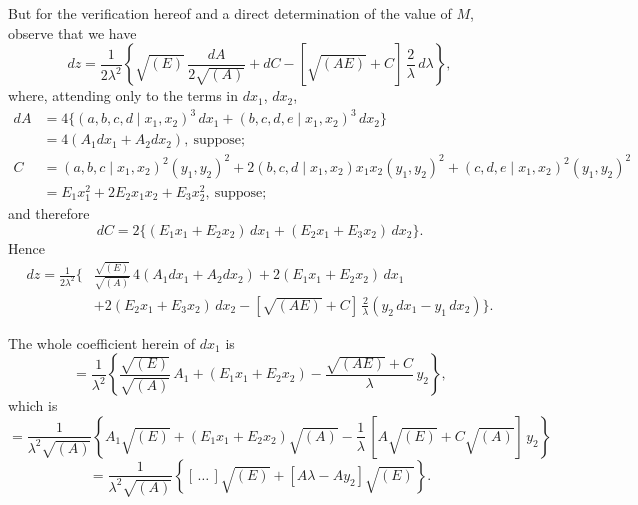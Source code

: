 \documentclass[11pt,a4paper]{article}
\begin{document}
But for the verification hereof and a direct determination of the value of $M$, observe that we have
\[
dz = \frac{1}{2\lambda^2}\!\left\{\sqrt{(E)}\,\frac{dA}{2\sqrt{(A)}} + dC - [\sqrt{(AE)} + C]\,\frac{2}{\lambda}\,d\lambda\right\},
\]
where, attending only to the terms in $dx_1$, $dx_2$,
\begin{align*}
dA &= 4\{(a, b, c, d \mid x_1, x_2)^3\,dx_1 + (b, c, d, e \mid x_1, x_2)^3\,dx_2\}\\
&= 4(A_1 dx_1 + A_2 dx_2),\ \text{suppose};\\
C &= (a, b, c \mid x_1, x_2)^2(y_1, y_2)^2 + 2(b, c, d \mid x_1, x_2)x_1 x_2(y_1, y_2)^2 + (c, d, e \mid x_1, x_2)^2(y_1, y_2)^2\\
&= E_1 x_1^2 + 2E_2 x_1 x_2 + E_3 x_2^2,\ \text{suppose};
\end{align*}
and therefore
\[
dC = 2\{(E_1 x_1 + E_2 x_2)\,dx_1 + (E_2 x_1 + E_3 x_2)\,dx_2\}.
\]
Hence
\begin{align*}
dz = \frac{1}{2\lambda^2}\!\bigg\{&\frac{\sqrt{(E)}}{\sqrt{(A)}}\,4(A_1 dx_1 + A_2 dx_2) + 2(E_1 x_1 + E_2 x_2)\,dx_1\\
&+ 2(E_2 x_1 + E_3 x_2)\,dx_2 - [\sqrt{(AE)} + C]\,\frac{2}{\lambda}(y_2\,dx_1 - y_1\,dx_2)\bigg\}.
\end{align*}

The whole coefficient herein of $dx_1$ is
\[
= \frac{1}{\lambda^2}\!\left\{\frac{\sqrt{(E)}}{\sqrt{(A)}}\,A_1 + (E_1 x_1 + E_2 x_2) - \frac{\sqrt{(AE)} + C}{\lambda}\,y_2\right\},
\]
which is
\[
= \frac{1}{\lambda^2 \sqrt{(A)}}\!\left\{A_1 \sqrt{(E)} + (E_1 x_1 + E_2 x_2)\sqrt{(A)} - \frac{1}{\lambda}\,[A\sqrt{(E)} + C\sqrt{(A)}]\,y_2\right\}
\]
\[
= \frac{1}{\lambda^2 \sqrt{(A)}}\!\left\{[\,\ldots\,]\sqrt{(E)} + [A\lambda - Ay_2]\sqrt{(E)}\right\}.
\]
\end{document}
